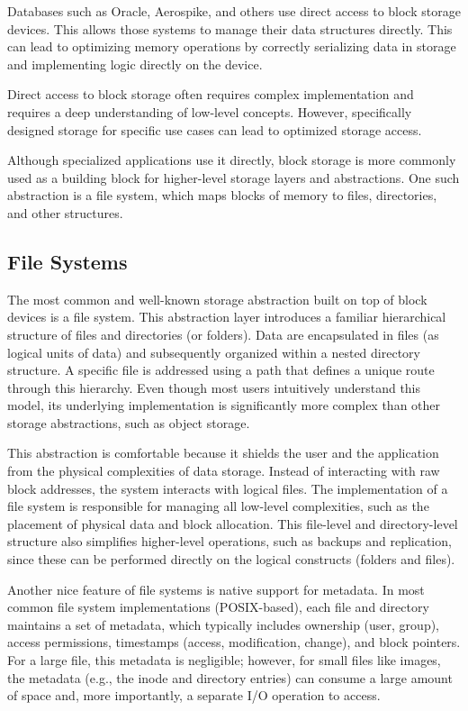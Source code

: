 Databases such as Oracle, Aerospike, and others use direct access to block storage devices. This allows those systems to manage their data structures directly. This can lead to optimizing memory operations by correctly serializing data in storage and implementing logic directly on the device. \cite{oracle_storing_2025, aerospike_ssd_2024} 

Direct access to block storage often requires complex implementation and requires a deep understanding of low-level concepts. However, specifically designed storage for specific use cases can lead to optimized storage access.

Although specialized applications use it directly, block storage is more commonly used as a building block for higher-level storage layers and abstractions. One such abstraction is a file system, which maps blocks of memory to files, directories, and other structures.\cite{muzikar_zarizeni_2025}

\subsection{File Systems}
The most common and well-known storage abstraction built on top of block devices is a file system. This abstraction layer introduces a familiar hierarchical structure of files and directories (or folders). Data are encapsulated in files (as logical units of data) and subsequently organized within a nested directory structure. A specific file is addressed using a path that defines a unique route through this hierarchy. Even though most users intuitively understand this model, its underlying implementation is significantly more complex than other storage abstractions, such as object storage.

This abstraction is comfortable because it shields the user and the application from the physical complexities of data storage. Instead of interacting with raw block addresses, the system interacts with logical files. The implementation of a file system is responsible for managing all low-level complexities, such as the placement of physical data and block allocation. This file-level and directory-level structure also simplifies higher-level operations, such as backups and replication, since these can be performed directly on the logical constructs (folders and files). \cite{muzikar_systemy_2025}

Another nice feature of file systems is native support for metadata. In most common file system implementations (POSIX-based), each file and directory maintains a set of metadata, which typically includes ownership (user, group), access permissions, timestamps (access, modification, change), and block pointers. For a large file, this metadata is negligible; however, for small files like images, the metadata (e.g., the inode and directory entries) can consume a large amount of space and, more importantly, a separate I/O operation to access.\cite{beaver_finding_2010}


